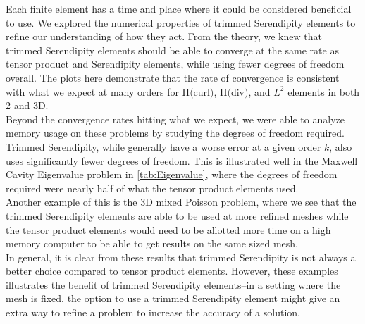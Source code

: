 \documentclass[manuscript,screen]{acmart}
\begin{document}
\noindent Each finite element has a time and place where it could be considered beneficial to use.  We explored the numerical properties of trimmed Serendipity elements to refine our understanding of how they act.  From the theory, we knew that trimmed Serendipity elements should be able to converge at the same rate as tensor product and Serendipity elements, while using fewer degrees of freedom overall.  The plots here demonstrate that the rate of convergence is consistent with what we expect at many orders for H$($curl$)$, H$($div$)$, and $L^2$ elements in both 2 and 3D.\\

\noindent Beyond the convergence rates hitting what we expect, we were able to analyze memory usage on these problems by studying the degrees of freedom required.  Trimmed Serendipity, while generally have a worse error at a given order $k$, also uses significantly fewer degrees of freedom.  This is illustrated well in the Maxwell Cavity Eigenvalue problem in \ref{tab:Eigenvalue}, where the degrees of freedom required were nearly half of what the tensor product elements used.  \\

\noindent Another example of this is the 3D mixed Poisson problem, where we see that the trimmed Serendipity elements are able to be used at more refined meshes while the tensor product elements would need to be allotted more time on a high memory computer to be able to get results on the same sized mesh.  \\

\noindent In general, it is clear from these results that trimmed Serendipity is not always a better choice compared to tensor product elements.  However, these examples illustrates the benefit of trimmed Serendipity elements--in a setting where the mesh is fixed, the option to use a trimmed Serendipity element might give an extra way to refine a problem to increase the accuracy of a solution.


\end{document}
